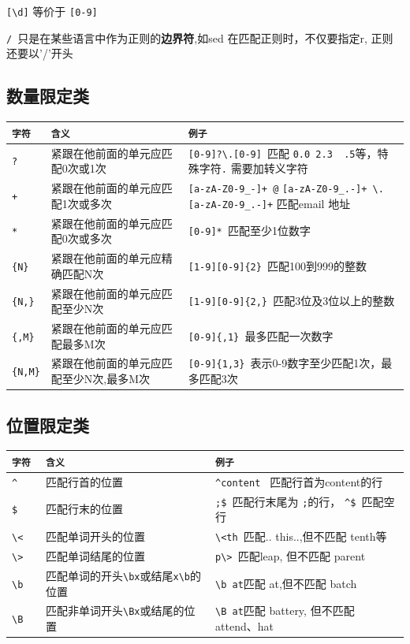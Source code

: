 \documentclass[UTF8,a4paper,12pt]{ctexbook}
\begin{document}
			\verb|[\d]| 等价于 \verb|[0-9]|
			
			\verb|/ |只是在某些语言中作为正则的\textbf{边界符},如sed 在匹配正则时，不仅要指定r, 正则还要以'/'开头
		\subsection{数量限定类}
			\begin{table}[H]
				\centering
				\begin{tabular}{l|m{8cm}|m{7cm}}
					\hline
					\verb|字符 |   	   & \verb|含义| & \verb|例子|\\
					\hline
					\verb|? |   	   & 紧跟在他前面的单元应匹配0次或1次 & \verb|[0-9]?\.[0-9] |匹配 \verb|0.0 2.3  .5|等，特殊字符\verb|.| 需要加转义字符 		\\
					\verb|+ |   	   & 紧跟在他前面的单元应匹配1次或多次 & \verb|[a-zA-Z0-9_-]+ @| \verb|[a-zA-Z0-9_.-]+ \.|\verb|[a-zA-Z0-9_.-]+| 匹配email 地址 \\
					\verb|* |   	   & 紧跟在他前面的单元应匹配0次或多次 & \verb|[0-9]* |匹配至少1位数字	 \\
					\verb|{N}|   	   & 紧跟在他前面的单元应精确匹配N次 & \verb|[1-9][0-9]{2} |匹配100到999的整数	\\
					\verb|{N,}|	  	   & 紧跟在他前面的单元应匹配至少N次 & \verb|[1-9][0-9]{2,} |匹配3位及3位以上的整数   \\
					\verb|{,M}|   	   & 紧跟在他前面的单元应匹配最多M次 & \verb|[0-9]{,1} |最多匹配一次数字	\\
					\verb|{N,M}|	   & 紧跟在他前面的单元应匹配至少N次,最多M次 &  \verb|[0-9]{1,3} |表示0-9数字至少匹配1次，最多匹配3次 \\
					\hline
				\end{tabular}
			\end{table}	
			
		\subsection{位置限定类}
			\begin{table}[H]
					\centering
				\begin{tabular}{l|m{8cm}|m{7cm}}
					\hline
						\verb|字符 |   	   & \verb|含义| & \verb|例子|\\
					\hline
						\verb|^ |   	   & 匹配行首的位置 & 	\verb|^content | 匹配行首为content的行\\
						\verb|$ |   	   & 匹配行末的位置 &  \verb|;$ |匹配行末尾为 \verb|;|的行， \verb|^$ |匹配空行\\
						\verb|\<|   	   & 匹配单词开头的位置 & \verb|\<th |匹配.. this..,但不匹配 tenth等 \\
						\verb|\>|   	   & 匹配单词结尾的位置 & \verb|p\> |匹配leap, 但不匹配 parent\\
						\verb|\b|	  	   & 匹配单词的开头\verb|\bx|或结尾\verb|x\b|的位置 & \verb|\b at|匹配 at,但不匹配 batch\\
						\verb|\B|   	   & 匹配非单词开头\verb|\Bx|或结尾的位置 & \verb|\B at|匹配 battery, 但不匹配 attend、hat\\
					\hline
				\end{tabular}
			\end{table}
		
\end{document}
